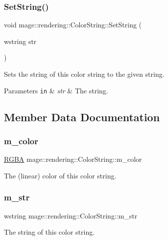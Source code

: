 \subsubsection{\texorpdfstring{Set\+String()}{SetString()}}
{\footnotesize\ttfamily void mage\+::rendering\+::\+Color\+String\+::\+Set\+String (\begin{DoxyParamCaption}\item[{wstring}]{str }\end{DoxyParamCaption})\hspace{0.3cm}{\ttfamily [noexcept]}}

Sets the string of this color string to the given string.


\begin{DoxyParams}[1]{Parameters}
\mbox{\tt in}  & {\em str} & The string. \\
\hline
\end{DoxyParams}


\subsection{Member Data Documentation}
\hypertarget{classmage_1_1rendering_1_1_color_string_a6b062bfa44b3786c5e8f2e8d18a373ca}{}\label{classmage_1_1rendering_1_1_color_string_a6b062bfa44b3786c5e8f2e8d18a373ca} 
\subsubsection{\texorpdfstring{m\+\_\+color}{m\_color}}
{\footnotesize\ttfamily \hyperlink{structmage_1_1_r_g_b_a}{R\+G\+BA} mage\+::rendering\+::\+Color\+String\+::m\+\_\+color\hspace{0.3cm}{\ttfamily [private]}}

The (linear) color of this color string. \hypertarget{classmage_1_1rendering_1_1_color_string_a226202625fbe205d78e1412310a49f1f}{}\label{classmage_1_1rendering_1_1_color_string_a226202625fbe205d78e1412310a49f1f} 
\subsubsection{\texorpdfstring{m\+\_\+str}{m\_str}}
{\footnotesize\ttfamily wstring mage\+::rendering\+::\+Color\+String\+::m\+\_\+str\hspace{0.3cm}{\ttfamily [private]}}

The string of this color string. 